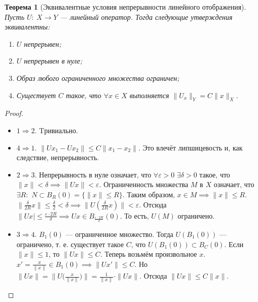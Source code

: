 \documentclass[11pt,openany,a4paper]{scrartcl}
\theoremstyle{plain}
\newtheorem{theorem}{Теорема}[section]
\theoremstyle{definition}
\begin{document}
\begin{theorem}[Эквивалентные условия непрерывности линейного отображения]
    Пусть $U:~X \to Y$ — линейный оператор. Тогда следующие утверждения
    эквивалентны:
    \begin{enumerate}
        \item $U$ непрерывен;
        \item $U$ непрерывен в нуле;
        \item Образ любого ограниченного множества ограничен;
        \item Существует $C$ такое, что $\forall x\in X$
        выполняется $\|U_x\|_Y = C\|x\|_X$.
    \end{enumerate}
\end{theorem}
\begin{proof}
\mbox{}
    \begin{itemize}
        \item $1 \Rightarrow 2$. Tривиально.
        \item $4 \Rightarrow 1$. $\|Ux_1 - Ux_2\| \leqslant
        C\|x_1 - x_2\|$. Это влечёт липшицевость и, как следствие, непрерывность.
        \item $2 \Rightarrow 3$. Непрерывность в нуле означает, что
        $\forall \varepsilon > 0$ $\exists \delta > 0$ такое, что
        $\|x\|<\delta \implies \|Ux\|<\varepsilon$. Ограниченность множества $M$ в $X$
        означает, что $\exists R:$ $N \subset B_R(0)=\{\|x\|\leqslant R\}$.
        Таким образом, $x\in M \implies \|x\| \leqslant R$.
        $\|\frac{\delta}{2R}x\| \leqslant \frac{\delta}{2} < \delta \implies
        \|U(\frac{\delta}{2R}x)\| < \varepsilon$. Отсюда
        $\|Ux| \leqslant \frac{\varepsilon\cdot 2R}{\delta} \implies Ux
        \in B_{\frac{\varepsilon\cdot 2R}{\delta}}(0)$. То есть, $U(M)$ ограничено.
        \item $3 \Rightarrow 4$. $B_1(0)$ — ограниченное множество. Тогда
        $U(B_1(0))$ — ограничено, т. е. существует такое $C$, что
        $U(B_1(0)) \subset B_C(0)$. Если $\|x\|\leqslant 1$, то $\|Ux\| \leqslant C$.
        Теперь возьмём произвольное $x$. $x' = \frac{x}{\|x\|} \in B_1(0) \implies
        \|Ux'\| \leqslant C$. Но $\|Ux\| = \|U\big(\frac{x}{\|x\|}\big)\| =
        \frac{1}{\|x\|} \cdot \|Ux\|$. Отсюда $\|Ux\|\leqslant C\|x\|$.
    \end{itemize} 
\end{proof}
\end{document}
